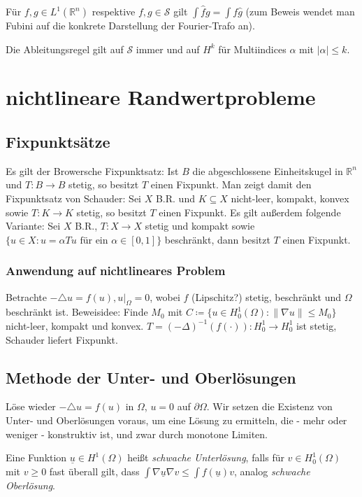\documentclass[11pt,a4paper]{scrartcl}
\newcommand{\R}{\mathbb{R}} %
\newcommand{\Sc}{\mathcal{S}}
\newcommand{\laplace}{\triangle}
\theoremstyle{plain}
\theoremstyle{definition}
\theoremstyle{remark}
\begin{document}
Für $f,g\in L^1(\R^n)$ respektive $f,g\in \Sc$ gilt $\int \hat f g = \int f \hat g$ (zum Beweis wendet man Fubini auf die konkrete Darstellung der Fourier-Trafo an).

Die Ableitungsregel gilt auf $\Sc$ immer und auf $H^k$ für Multiindices $\alpha$ mit $|\alpha| \leq k$.

\section{nichtlineare Randwertprobleme}

\subsection{Fixpunktsätze}

Es gilt der Browersche Fixpunktsatz: Ist $B$ die abgeschlossene Einheitskugel in $\R^n$ und $T:B\to B$ stetig, so besitzt $T$ einen Fixpunkt. Man zeigt damit den Fixpunktsatz von Schauder: Sei $X$ B.R. und $K\subseteq X$ nicht-leer, kompakt, konvex sowie $T:K\to K$ stetig, so besitzt $T$ einen Fixpunkt. Es gilt außerdem folgende Variante: Sei $X$ B.R., $T:X\to X$ stetig und kompakt sowie $\{ u\in X: u = \alpha Tu \text{ für ein } \alpha \in [0,1]\}$ beschränkt, dann besitzt $T$ einen Fixpunkt.

\subsubsection{Anwendung auf nichtlineares Problem}

Betrachte $-\laplace u = f(u), u|_\Omega = 0$, wobei $f$ (Lipschitz?) stetig, beschränkt und $\Omega$ beschränkt ist. Beweisidee: Finde $M_0$ mit $C\coloneqq \{ u\in H^1_0(\Omega): \|\nabla u\| \leq M_0\}$ nicht-leer, kompakt und konvex. $T = (-\Delta)^{-1}(f(\cdot)): H^1_0\to H^1_0$ ist stetig, Schauder liefert Fixpunkt.

\subsection{Methode der Unter- und Oberlösungen}

Löse wieder $-\laplace u = f(u)$ in $\Omega$, $u=0$ auf $\partial\Omega$. Wir setzen die Existenz von Unter- und Oberlösungen voraus, um eine Lösung zu ermitteln, die - mehr oder weniger - konstruktiv ist, und zwar durch monotone Limiten.

Eine Funktion $\underline{u}\in H^1(\Omega)$ heißt \emph{schwache Unterlösung}, falls für $v\in H^1_0(\Omega)$ mit $v\geq 0$ fast überall gilt, dass $\int \nabla \underline{u} \nabla v \leq \int f(\underline{u})v$, analog \emph{schwache Oberlösung}.
\end{document}
